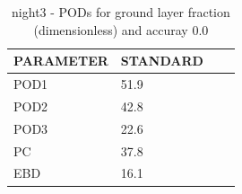 \begin{table}[p!]
\begin{center}
\begin{tabular}{|l|l|l|l|}
\hline
\multicolumn{1}{|c|}{\cellcolor[HTML]{C0C0C0}\textbf{PARAMETER}} & \multicolumn{1}{c|}{\cellcolor[HTML]{C0C0C0}\textbf{STANDARD}} \\
\hline
\cellcolor[HTML]{C0C0C0}POD1  & 51.9                                \\
\cellcolor[HTML]{C0C0C0}POD2  & 42.8                                \\
\cellcolor[HTML]{C0C0C0}POD3  & 22.6                                \\
\cellcolor[HTML]{C0C0C0}PC    & 37.8                                  \\
\cellcolor[HTML]{C0C0C0}EBD   & 16.1                                 \\
\hline
\end{tabular}
\caption{night3 - PODs for ground layer fraction (dimensionless) and accuray 0.0}
\label{tab:podglf0.0:night3}
\end{center}
\end{table}
